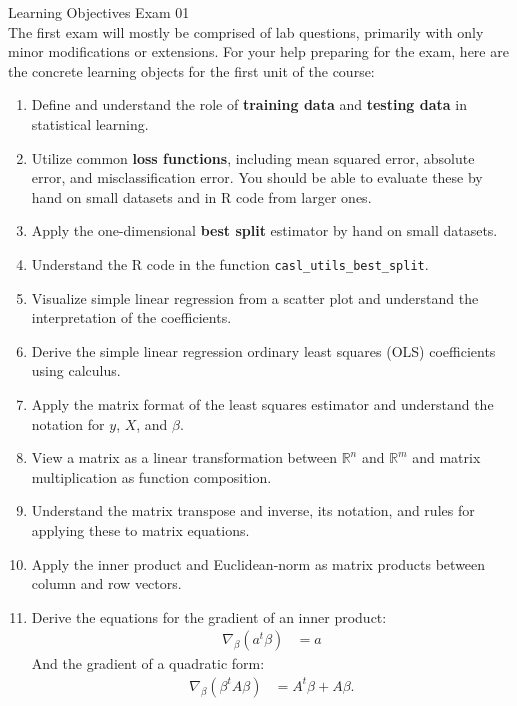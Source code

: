 \documentclass[11pt]{article}
\begin{document}
{\LARGE \textcolor{oiB}{Learning Objectives \hfill Exam 01}} \\

The first exam will mostly be comprised of lab questions, primarily with only
minor modifications or extensions. For your help preparing for the exam, here
are the concrete learning objects for the first unit of the course:

\begin{enumerate}
\renewcommand\labelenumi{\textcolor{light}{\textbf{LO \theenumi.}}}

\item Define and understand the role of \textbf{training data} and
\textbf{testing data} in statistical learning.

\item Utilize common \textbf{loss functions}, including mean squared error,
absolute error, and misclassification error. You should be able to evaluate
these by hand on small datasets and in R code from larger ones.

\item Apply the one-dimensional \textbf{best split} estimator by hand on small
datasets.

\item Understand the R code in the function \verb|casl_utils_best_split|.

\item Visualize simple linear regression from a scatter plot and understand
the interpretation of the coefficients.

\item Derive the simple linear regression ordinary least squares (OLS)
coefficients using calculus.

\item Apply the matrix format of the least squares estimator and understand
the notation for $y$, $X$, and $\beta$.

\item View a matrix as a linear transformation between $\mathbb{R}^n$ and
$\mathbb{R}^m$ and matrix multiplication as function composition.

\item Understand the matrix transpose and inverse, its notation, and rules
for applying these to matrix equations.

\item Apply the inner product and Euclidean-norm as matrix products between
column and row vectors.

\item Derive the equations for the gradient of an inner product:
\begin{align*}
\nabla_\beta \left( a^t \beta \right) &= a
\end{align*}
And the gradient of a quadratic form:
\begin{align*}
\nabla_\beta \left( \beta^t A \beta \right) &= A^t \beta + A \beta.
\end{align*}


\end{enumerate}
\end{document}
